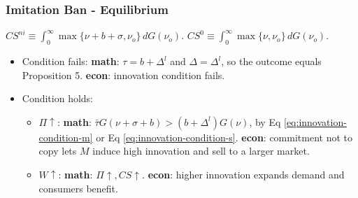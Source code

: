 \begin{frame}
  \frametitle{Imitation Ban - Equilibrium}
  \scriptsize

  \begin{table}
    \centering
    \caption{Effects of banning imitation (Proposition 8) v.s. Table \ref{tab:Proposition5}}
    \label{tab:imitation-ban-effects}
    \begin{threeparttable}
    \begin{tablenotes}
      \scriptsize
      \item $CS^{ni}\equiv\int_0^\infty\max\{\nu+b+\sigma,\nu_o\}\,dG(\nu_o)$.
      $CS^0\equiv\int_0^\infty\max\{\nu,\nu_o\}\,dG(\nu_o)$.
    \end{tablenotes}
    \end{threeparttable}
  \end{table}

  \vspace{-0.15cm}
  \begin{itemize}
    \item Condition fails: \textbf{math}: $\tau=b+\Delta^l$ and $\Delta=\Delta^l$, so the outcome equals Proposition 5. \textbf{econ}: innovation condition fails.
    \item Condition holds:
    \begin{itemize}\scriptsize
      \item $\Pi \uparrow$: \textbf{math}: $\bar{\tau}G(\nu+\sigma+b) > (b+\Delta^l)G(\nu)$, by Eq \eqref{eq:innovation-condition-m} or Eq \eqref{eq:innovation-condition-s}. \textbf{econ}: commitment not to copy lets $M$ induce high innovation and sell to a larger market.
      \item $W \uparrow$: \textbf{math}: $\Pi\uparrow, CS \uparrow$. \textbf{econ}: higher innovation expands demand and consumers benefit.
    \end{itemize}
  \end{itemize}
\end{frame}

